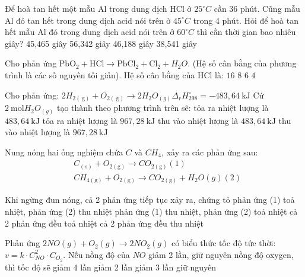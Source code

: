 \begin{ex}
	Để hoà tan hết một mẫu $\mathrm{Al}$ trong dung dịch $\mathrm{HCl}$ ở $25^{\circ} C$ cần 36 phút. Cũng mẫu $\mathrm{Al}$ đó tan hết trong dung dịch acid nói trên ở $45^{\circ} C$ trong 4 phút. Hỏi để hoà tan hết mẫu $\mathrm{Al}$ đó trong dung dịch acid nói trên ở $60^{\circ} C$ thì cần thời gian bao nhiêu giây?
	\choice
	{45,465 giây}
	{56,342 giây}
	{46,188 giây}
	{38,541 giây}
	\loigiai{}
\end{ex}
\begin{ex}
	Cho phản ứng $\mathrm{PbO}_2+\mathrm{HCl} \to \mathrm{PbCl}_2+\mathrm{Cl}_2+H_2O$. (Hệ số cân bằng của phương trình là các số nguyên tối giản). Hệ số cân bằng của $\mathrm{HCl}$ là:
	\choice
	{$16$}
	{$8$}
	{$6$}
	{$4$}
	\loigiai{}
\end{ex}
\begin{ex}
	Cho phản ứng: $2H_{2(\mathrm{~g})}+O_{2(\mathrm{~g})} \to 2H_2O_{(g)} \Delta_r H_{298}^{\circ}=-483,64\mathrm{~kJ}$
	Cứ $2\mathrm{~mol} H_2O_{(g)}$ tạo thành theo phương trình trên sẽ:
	\choice
	{tỏa ra nhiệt lượng là $483,64\mathrm{~kJ}$}
	{tỏa ra nhiệt lượng là $967,28\mathrm{~kJ}$}
	{thu vào nhiệt lượng là $483,64\mathrm{~kJ}$}
	{thu vào nhiệt lượng là $967,28\mathrm{~kJ}$}
	\loigiai{}
\end{ex}
\begin{ex}
	Nung nóng hai ống nghiệm chứa $C$ và $CH_4$, xảy ra các phản ứng sau:
	$$
	\begin{aligned}
		& C_{(s)}+O_{2(\mathrm{g})} \to CO_{2(\mathrm{g})}(1) \\
		& CH_{4(\mathrm{g})}+O_{2(\mathrm{g})} \to CO_{2(\mathrm{g})}+H_2 O(g)(2)
	\end{aligned}
	$$
	
	Khi ngừng đun nóng, cả 2 phản ứng tiếp tục xảy ra, chứng tỏ
	\choice
	{phản ứng (1) toả nhiệt, phản ứng (2) thu nhiệt}
	{phản ứng (1) thu nhiệt, phản ứng (2) toả nhiệt}
	{cả 2 phản ứng đều toả nhiệt}
	{cả 2 phản ứng đều thu nhiệt}
	\loigiai{}
\end{ex}
\begin{ex}
	Phản ứng $2NO(g)+O_2(g) \to 2NO_2(g)$ có biểu thức tốc độ tức thời: $v=k \cdot C_{NO}^2\cdot C_{O_2}$. Nếu nồng độ của $NO$ giảm 2 lần, giữ nguyên nồng độ oxygen, thì tốc độ sẽ
	\choice
	{giảm 4 lần}
	{giảm 2 lần}
	{giảm 3 lần}
	{giữ nguyên}
	\loigiai{}
\end{ex}
